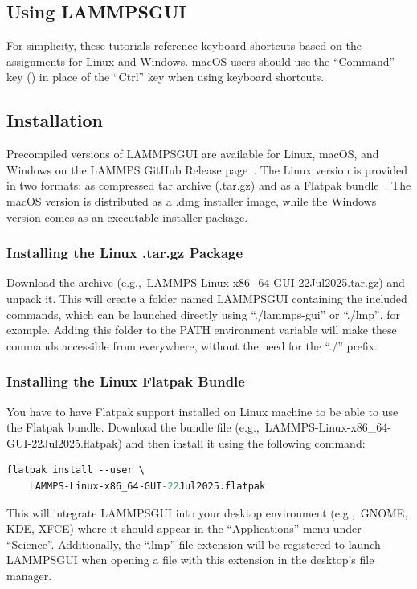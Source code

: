 \documentclass[9pt,tutorial]{livecoms}
\newcommand{\lammpsgui}{\textsf{LAMMPS\textendash GUI}}
\begin{document}
\begin{appendices}
\section{Using \lammpsgui{}}
\label{using-lammps-gui-label}

\begin{note}
For simplicity, these tutorials reference keyboard shortcuts
based on the assignments for Linux and Windows.  {macOS} users should
use the ``Command'' key (\cmd) in place of the
``Ctrl'' key when using keyboard shortcuts.
\end{note}

\subsection{Installation}

Precompiled versions of \lammpsgui{} are available for Linux, {macOS},
and Windows on the LAMMPS GitHub Release
page~\cite{lammps_github_release}.  The Linux version is provided in two
formats: as compressed tar archive (.tar.gz) and as a Flatpak
bundle~\cite{flatpak_home}.  The {macOS} version is distributed as a
.dmg installer image, while the Windows version comes as an executable
installer package.

\subsubsection{Installing the Linux .tar.gz Package}

Download the archive {\color{blue}(e.g.,~LAMMPS-Linux-x86\_64-GUI-22Jul2025.tar.gz)}
and unpack it.  This will create a folder named \lammpsgui{} containing the
included commands, which can be launched directly using ``./lammps-gui'' or
``./lmp'', for example.  Adding this folder to the PATH environment
variable will make these commands accessible from everywhere, without the
need for the ``./'' prefix.

\subsubsection{Installing the Linux Flatpak Bundle}

You have to have Flatpak support installed on Linux machine to be able
to use the Flatpak bundle.  Download the bundle file
{\color{blue}(e.g.,~LAMMPS-Linux-x86\_64-GUI-22Jul2025.flatpak)} and then
install it using the following command:
\begin{lstlisting}[language=tcl]
flatpak install --user \
    LAMMPS-Linux-x86_64-GUI-22Jul2025.flatpak
\end{lstlisting}
This will integrate \lammpsgui{} into your desktop environment
(e.g.,~GNOME, KDE, XFCE) where it should appear in the ``Applications''
menu under ``Science''.  Additionally, the ``.lmp'' file extension will be
registered to launch \lammpsgui{} when opening a file with this
extension in the desktop's file manager.


\end{appendices}
\end{document}
